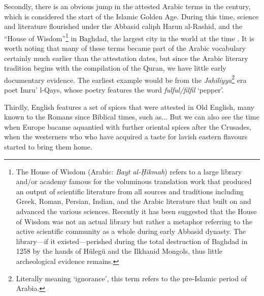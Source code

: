 Secondly, there is an obvious jump in the attested Arabic terms in the  century, which is considered the start of the Islamic Golden Age. During this time, science and literature flourished under the Abbasid caliph Harun al-Rashid, and the ``House of Wisdom''\footnote{The House of Wisdom (Arabic: \textit{Bayt al-Ḥikmah}) refers to a large library and/or academy famous for the voluminous translation work that produced an output of scientific literature from all sources and traditions including Greek, Roman, Persian, Indian, and the Arabic literature that built on and advanced the various sciences. Recently it has been suggested that the House of Wisdom was not an actual library but rather a metaphor referring to the active scientific community as a whole during early Abbasid dynasty. The library---if it existed---perished during the total destruction of Baghdad in 1258 by the hands of Hülegü and the Ilkhanid Mongols, thus little archeological evidence remains.} in Baghdad, the largest city in the world at the time \autocite{gutas_greek_1998}. It is worth noting that many of these terms became part of the Arabic vocabulary certainly much earlier than the attestation dates, but since the Arabic literary tradition begins with the compilation of the Quran, we have little early documentary evidence. The earliest example would be from the \textit{Jahiliyya}\footnote{Literally meaning `ignorance', this term refers to the pre-Islamic period of Arabia.} era poet Imru' l-Qays, whose poetry features the word \textit{fulful/filfil} `pepper'.

Thirdly, English features a set of spices that were attested in Old English, many known to the Romans since Biblical times, such as...
But we can also see the time when Europe bacame aquantied with further oriental spices after the Crusades, when the westerners who who have acquired a taste for lavish eastern flavours started to bring them home.










